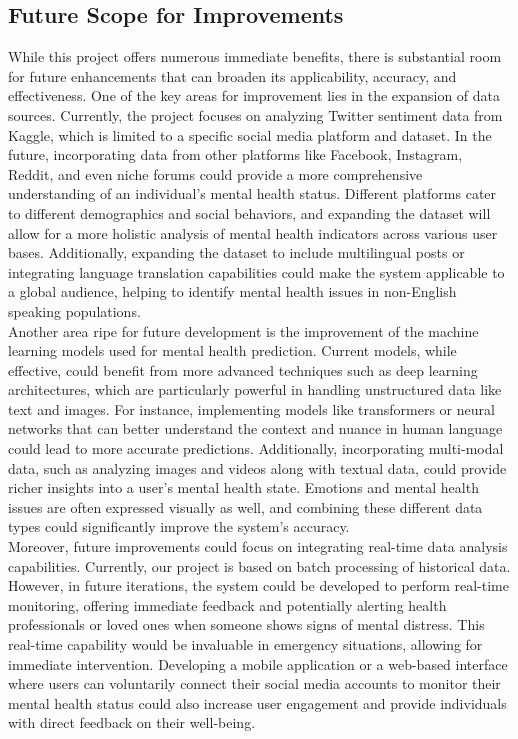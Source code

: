 \subsection{Future Scope for Improvements}
\noindent
While this project offers numerous immediate benefits, there is substantial room for future enhancements that can broaden its applicability, accuracy, and effectiveness. One of the key areas for improvement lies in the expansion of data sources. Currently, the project focuses on analyzing Twitter sentiment data from Kaggle, which is limited to a specific social media platform and dataset. In the future, incorporating data from other platforms like Facebook, Instagram, Reddit, and even niche forums could provide a more comprehensive understanding of an individual’s mental health status. Different platforms cater to different demographics and social behaviors, and expanding the dataset will allow for a more holistic analysis of mental health indicators across various user bases. Additionally, expanding the dataset to include multilingual posts or integrating language translation capabilities could make the system applicable to a global audience, helping to identify mental health issues in non-English speaking populations. \\

\noindent
Another area ripe for future development is the improvement of the machine learning models used for mental health prediction. Current models, while effective, could benefit from more advanced techniques such as deep learning architectures, which are particularly powerful in handling unstructured data like text and images. For instance, implementing models like transformers or neural networks that can better understand the context and nuance in human language could lead to more accurate predictions. Additionally, incorporating multi-modal data, such as analyzing images and videos along with textual data, could provide richer insights into a user’s mental health state. Emotions and mental health issues are often expressed visually as well, and combining these different data types could significantly improve the system’s accuracy. \\

\noindent
Moreover, future improvements could focus on integrating real-time data analysis capabilities. Currently, our project is based on batch processing of historical data. However, in future iterations, the system could be developed to perform real-time monitoring, offering immediate feedback and potentially alerting health professionals or loved ones when someone shows signs of mental distress. This real-time capability would be invaluable in emergency situations, allowing for immediate intervention. Developing a mobile application or a web-based interface where users can voluntarily connect their social media accounts to monitor their mental health status could also increase user engagement and provide individuals with direct feedback on their well-being. \\

